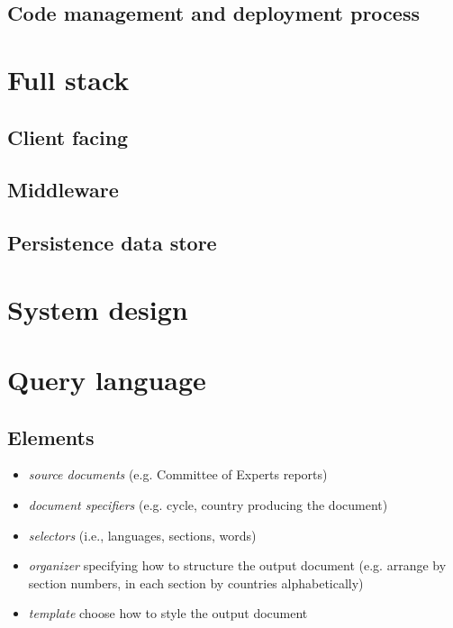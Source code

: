 \documentclass[11pt, a4paper]{report}
\begin{document}
\subsection{Code management and deployment process}

\section{Full stack}
\subsection{Client facing}
\subsection{Middleware}
\subsection{Persistence data store}


\section{System design}

\section{Query language}

\subsection{Elements}
\begin{itemize}
  \item \emph{source documents} (e.g. Committee of Experts reports)
  \item \emph{document specifiers} (e.g. cycle, country producing the document)
  \item \emph{selectors} (i.e., languages, sections, words)
  \item \emph{organizer} specifying how to structure the output document (e.g. arrange by section numbers, in each section by countries alphabetically)
  \item \emph{template} choose how to style the output document
\end{itemize}
\end{document}
